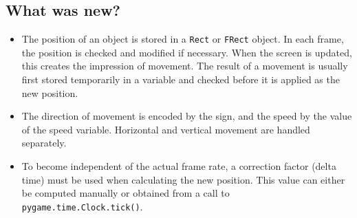 \subsection{What was new?}
\begin{hintbox}
	\begin{itemize}
		\item The position of an object is stored in a \texttt{Rect} or \texttt{FRect} object. In each frame, the position is checked and modified if necessary. When the screen is updated, this creates the impression of movement. The result of a movement is usually first stored temporarily in a variable and checked before it is applied as the new position.
		
		\item The direction of movement is encoded by the sign, and the speed by the value of the speed variable. Horizontal and vertical movement are handled separately. 
		
		\item To become independent of the actual frame rate, a correction factor (delta time) must be used when calculating the new position. This value can either be computed manually or obtained from a call to \texttt{pygame.time.Clock.tick()}.
	\end{itemize}
\end{hintbox}

